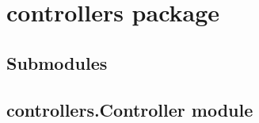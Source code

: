 \documentclass[letterpaper,10pt,english,openany,oneside]{sphinxmanual}
\begin{document}
\section{controllers package}
\label{\detokenize{_modules/controllers:controllers-package}}\label{\detokenize{_modules/controllers::doc}}

\subsection{Submodules}
\label{\detokenize{_modules/controllers:submodules}}

\subsection{controllers.Controller module}
\label{\detokenize{_modules/controllers:module-controllers.Controller}}\label{\detokenize{_modules/controllers:controllers-controller-module}}
\end{document}
